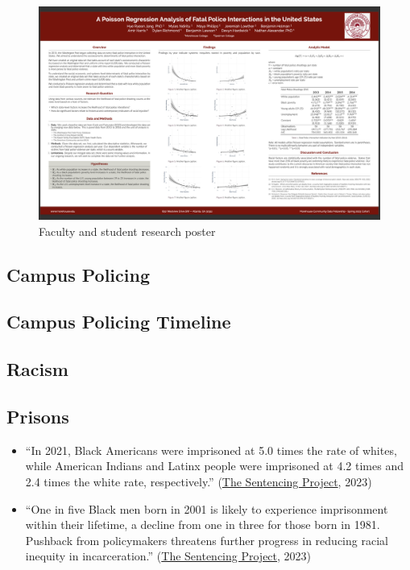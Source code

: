 \documentclass[
  letterpaper,
  DIV=11,
  numbers=noendperiod]{scrartcl}
\begin{document}
\begin{figure}

{\centering \includegraphics{poster3.png}

}

\caption{Faculty and student research poster}

\end{figure}

\hypertarget{campus-policing}{%
\subsection{Campus Policing}\label{campus-policing}}

\hypertarget{campus-policing-timeline}{%
\subsection{Campus Policing Timeline}\label{campus-policing-timeline}}

\hypertarget{racism}{%
\subsection{Racism}\label{racism}}

\hypertarget{prisons}{%
\subsection{Prisons}\label{prisons}}

\begin{itemize}
\item
  ``In 2021, Black Americans were imprisoned at 5.0 times the rate of
  whites, while American Indians and Latinx people were imprisoned at
  4.2 times and 2.4 times the white rate, respectively.''
  (\href{https://www.sentencingproject.org/reports/one-in-five-ending-racial-inequity-in-incarceration/}{The
  Sentencing Project}, 2023)
\item
  ``One in five Black men born in 2001 is likely to experience
  imprisonment within their lifetime, a decline from one in three for
  those born in 1981. Pushback from policymakers threatens further
  progress in reducing racial inequity in incarceration.''
  (\href{https://www.sentencingproject.org/reports/one-in-five-ending-racial-inequity-in-incarceration/}{The
  Sentencing Project}, 2023)
\end{itemize}
\end{document}
